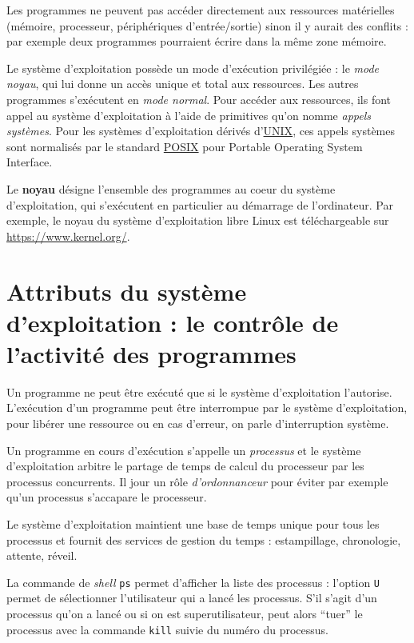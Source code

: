 \documentclass[
  11pt,
]{article}
\newcounter{cours}
\newcounter{prog}
\newcounter{logi}
\begin{document}
Les programmes ne peuvent pas accéder directement aux ressources
matérielles (mémoire, processeur, périphériques d'entrée/sortie) sinon
il y aurait des conflits : par exemple deux programmes pourraient écrire
dans la même zone mémoire.

Le système d'exploitation possède un mode d'exécution privilégiée : le
\emph{mode noyau}, qui lui donne un accès unique et total aux
ressources. Les autres programmes s'exécutent en \emph{mode normal}.
Pour accéder aux ressources, ils font appel au système d'exploitation à
l'aide de primitives qu'on nomme \emph{appels systèmes}. Pour les
systèmes d'exploitation dérivés d'\href{}{UNIX}, ces appels systèmes
sont normalisés par le standard
\href{https://fr.wikipedia.org/wiki/POSIX}{POSIX} pour Portable
Operating System Interface.

Le \textbf{noyau} désigne l'ensemble des programmes au coeur du système
d'exploitation, qui s'exécutent en particulier au démarrage de
l'ordinateur. Par exemple, le noyau du système d'exploitation libre
Linux est téléchargeable sur \url{https://www.kernel.org/}.

\hypertarget{attributs-du-systuxe8me-dexploitation-le-contruxf4le-de-lactivituxe9-des-programmes}{%
\section{Attributs du système d'exploitation : le contrôle de l'activité
des
programmes}\label{attributs-du-systuxe8me-dexploitation-le-contruxf4le-de-lactivituxe9-des-programmes}}

Un programme ne peut être exécuté que si le système d'exploitation
l'autorise. L'exécution d'un programme peut être interrompue par le
système d'exploitation, pour libérer une ressource ou en cas d'erreur,
on parle d'interruption système.

Un programme en cours d'exécution s'appelle un \emph{processus} et le
système d'exploitation arbitre le partage de temps de calcul du
processeur par les processus concurrents. Il jour un rôle
\emph{d'ordonnanceur} pour éviter par exemple qu'un processus s'accapare
le processeur.

Le système d'exploitation maintient une base de temps unique pour tous
les processus et fournit des services de gestion du temps :
estampillage, chronologie, attente, réveil.

La commande de \emph{shell} \texttt{ps} permet d'afficher la liste des
processus : l'option \texttt{U} permet de sélectionner l'utilisateur qui
a lancé les processus. S'il s'agit d'un processus qu'on a lancé ou si on
est superutilisateur, peut alors ``tuer'' le processus avec la commande
\texttt{kill} suivie du numéro du processus.
\end{document}
